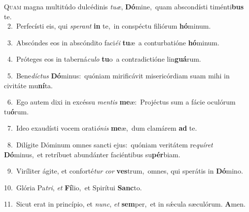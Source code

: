 \lettrine{\initial\textcolor{\initialcolor}{Q}}{uam} magna multitúdo dulcédinis \textit{tu}\-\textit{æ}, \textbf{Dó}\-mine,~\star quam abscondísti timénti\textbf{bus} te.\\
{\numbfont\textcolor{\numbcolor}{~2.}}~Perfecísti eis, qui \textit{spe}\-\textit{rant} \textbf{in} te,~\star in conspéctu filiórum \textbf{hó}\-minum.\par
{\numbfont\textcolor{\numbcolor}{~3.}}~Abscóndes eos in abscóndito faci\-\textit{é}\-\textit{i} \textbf{tu}\-æ~\star a conturbatióne \textbf{hó}\-minum.\par
{\numbfont\textcolor{\numbcolor}{~4.}}~Próteges eos in taberná\-\textit{cu}\-\textit{lo} \textbf{tu}\-o~\star a contradictióne lin\-\textbf{guá}\-rum.\par
{\numbfont\textcolor{\numbcolor}{~5.}}~Bene\-\textit{díc}\-\textit{tus} \textbf{Dó}\-minus:~\star quóniam mirificávit misericórdiam suam mihi in civitáte mu\-\textbf{ní}\-ta.\par
{\numbfont\textcolor{\numbcolor}{~6.}}~Ego autem dixi in excéssu \textit{men}\-\textit{tis} \textbf{me}\-æ:~\star Projéctus sum a fácie oculórum tu\-\textbf{ó}\-rum.\par
{\numbfont\textcolor{\numbcolor}{~7.}}~Ideo exaudísti vocem orati\-\textit{ó}\-\textit{nis} \textbf{me}\-æ,~\star dum clamárem \textbf{ad} te.\par
{\numbfont\textcolor{\numbcolor}{~8.}}~Dilígite Dóminum omnes sancti ejus:~\dagger quóniam veritátem re\-\textit{quí}\-\textit{ret} \textbf{Dó}\-minus,~\star et retríbuet abundánter faciéntibus su\-\textbf{pér}\-biam.\par
{\numbfont\textcolor{\numbcolor}{~9.}}~Viríliter ágite, et conforté\textit{tur} \textit{cor} \textbf{ves}\-trum,~\star omnes, qui sperátis in \textbf{Dó}\-mino.\par
{\numbfont\textcolor{\numbcolor}{10.}}~Glória Pa\-\textit{tri}\-, \textit{et} \textbf{Fí}\-lio,~\star et Spirítui \textbf{Sanc}\-to.\par
{\numbfont\textcolor{\numbcolor}{11.}}~Sicut erat in princípio, et \textit{nunc}\-, \textit{et} \textbf{sem}\-per,~\star et in sǽcula sæculórum. \textbf{A}\-men.\par

